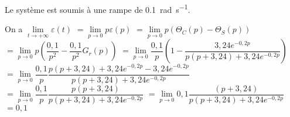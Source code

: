 \else 
\fi
 
Le système est soumis à une rampe de \SI{0,1}{rad.s^{-1}}.
\ifprof

On a $\lim\limits_{t\to +\infty} \varepsilon(t) $
$= \lim\limits_{p\to 0} p\varepsilon(p) $
$= \lim\limits_{p\to 0} p\left( \Theta_C(p) - \Theta_S(p) \right) $
$= \lim\limits_{p\to 0} p\left( \dfrac{0,1}{p^2}-\dfrac{0,1}{p^2} G_r(p) \right) $
$= \lim\limits_{p\to 0}  \dfrac{0,1}{p}\left(1-\dfrac{3,24e^{-0,2 p}}{p\left(p+3,24\right)+3,24e^{-0,2 p}} \right) $
$= \lim\limits_{p\to 0}  \dfrac{0,1}{p}\dfrac{p\left(p+3,24\right)+3,24e^{-0,2 p}-3,24e^{-0,2 p}}{p\left(p+3,24\right)+3,24e^{-0,2 p}}  $
$= \lim\limits_{p\to 0}  \dfrac{0,1}{p}\dfrac{p\left(p+3,24\right)}{p\left(p+3,24\right)+3,24e^{-0,2 p}}  $
$= \lim\limits_{p\to 0}  0,1\dfrac{\left(p+3,24\right)}{p\left(p+3,24\right)+3,24e^{-0,2 p}}  $
$=  0,1 $
\else 
\fi

 
%
\ifprof
\else

\noindent\footnotesize
\normalsize



\fi